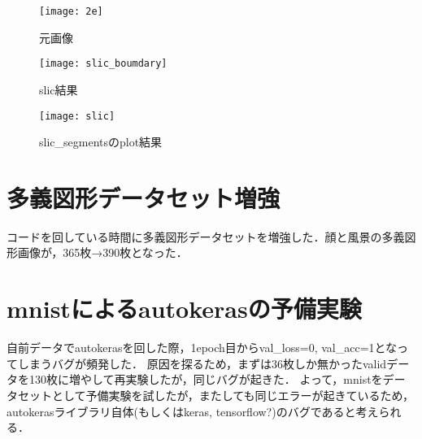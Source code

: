 \documentclass[11pt,a4j]{jarticle} 			%
\begin{document}
	
\begin{figure}
	\centering
	\texttt{[image: 2e]}
	\caption{元画像}
	\label{fig:2e}
\end{figure}
\begin{figure}
	\centering
	\texttt{[image: slic\_boumdary]}
	\caption{slic結果}
	\label{fig:slicboumdary}
\end{figure}
\begin{figure}
	\centering
	\texttt{[image: slic]}
	\caption{slic\_segmentsのplot結果}
	\label{fig:slic}
\end{figure}

\section{多義図形データセット増強}
コードを回している時間に多義図形データセットを増強した．顔と風景の多義図形画像が，365枚→390枚となった．

\section{mnistによるautokerasの予備実験}
自前データでautokerasを回した際，1epoch目からval\_loss=0, val\_acc=1となってしまうバグが頻発した．
原因を探るため，まずは36枚しか無かったvalidデータを130枚に増やして再実験したが，同じバグが起きた．
よって，mnistをデータセットとして予備実験を試したが，またしても同じエラーが起きているため，autokerasライブラリ自体(もしくはkeras, tensorflow?)のバグであると考えられる．
\end{document}
